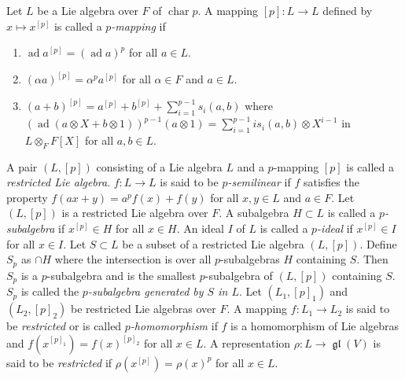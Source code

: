 \documentclass[12pt,MSc]{muthesis_2023}
\theoremstyle{plain}%
\theoremstyle{definition}
\theoremstyle{remark}
\DeclareMathOperator{\ad}{ad}
\DeclareMathOperator{\gl}{\mathfrak{gl}}
\begin{document}
Let $L$ be a Lie algebra over $F$ of $\operatorname{char} p$. A mapping $[p]: L \rightarrow L$ defined by $x \mapsto x^{[p]}$ is called a \textit{$p$-mapping} if
\begin{enumerate}\label{pmap1}
\item[(1)]
$\ad a^{[p]} = (\ad a)^p$ \; for all $a \in L$.
\item[(2)]
$(\alpha a)^{[p]} = \alpha^p a^{[p]}$ \; for all $\alpha \in F$ and $a \in L$.
\item[(3)]
$(a + b)^{[p]} = a^{[p]} + b^{[p]} + \sum^{p-1}_{i=1} s_i(a, b)$ where $(\ad(a \otimes X + b \otimes 1))^{p-1}(a \otimes 1) = \sum^{p-1}_{i=1} i s_i(a, b) \otimes X^{i-1}$ in $L \otimes_F F[X]$ for all $a, b \in L$.
\end{enumerate}
A pair $(L, [p])$ consisting of a Lie algebra $L$ and a $p$-mapping $[p]$ is called a \textit{restricted Lie algebra}.
$f:L\rightarrow L$ is said to be \textit{$p$-semilinear} if $f$ satisfies the property $f(ax+y)=a^pf(x)+f(y)$ for all $x,y\in L$ and $a\in F$. Let $(L, [p])$ is a restricted Lie algebra over $F$. A subalgebra $H\subset L$ is called a \textit{$p$-subalgebra} if $x^{[p]}\in H$ for all $x\in H$. An ideal $I$ of $L$ is called a \textit{$p$-ideal} if $x^{[p]}\in I$ for all $x\in I$. Let $S\subset L$ be a subset of a restricted Lie algebra $(L, [p])$. Define $S_p$ as $\cap H$ where the intersection is over all $p$-subalgebras $H$ containing $S$. Then $S_p$ is a $p$-subalgebra and is the smallest $p$-subalgebra of $(L, [p])$ containing $S$. $S_p$ is called the \textit{$p$-subalgebra generated by $S$ in $L$}. Let $(L_1, [p]_1)$ and $(L_2, [p]_2)$ be restricted Lie algebras over $F$. A mapping $f:L_1\rightarrow L_2$ is said to be \textit{restricted} or is called \textit{$p$-homomorphism} if $f$ is a homomorphism of Lie algebras and $f(x^{[p]_1})={f(x)}^{[p]_2}$ for all $x\in L$. A representation $\rho:L\rightarrow \gl(V)$ is said to be \textit{restricted} if $\rho(x^{[p]})={\rho(x)}^p$ for all $x\in L$.
\end{document}
